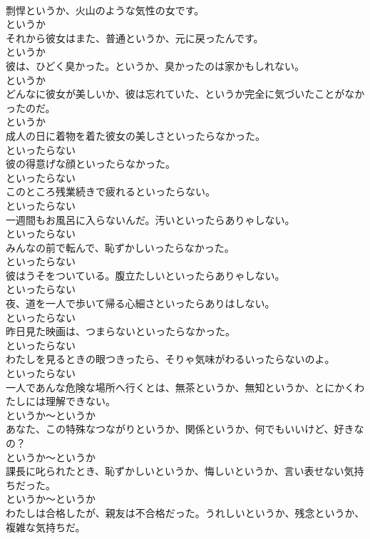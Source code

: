 \documentclass[8pt]{extreport}
\begin{document}
\begin{CJK}{UTF8}{min}
\\	剽悍というか、火山のような気性の女です。	
\\	というか
\\	それから彼女はまた、普通というか、元に戻ったんです。	
\\	というか
\\	彼は、ひどく臭かった。というか、臭かったのは家かもしれない。	
\\	というか
\\	どんなに彼女が美しいか、彼は忘れていた、というか完全に気づいたことがなかったのだ。	
\\	というか
\\	成人の日に着物を着た彼女の美しさといったらなかった。	
\\	といったらない
\\	彼の得意げな顔といったらなかった。	
\\	といったらない
\\	このところ残業続きで疲れるといったらない。	
\\	といったらない
\\	一週間もお風呂に入らないんだ。汚いといったらありゃしない。	
\\	といったらない
\\	みんなの前で転んで、恥ずかしいったらなかった。	
\\	といったらない
\\	彼はうそをついている。腹立たしいといったらありゃしない。	
\\	といったらない
\\	夜、道を一人で歩いて帰る心細さといったらありはしない。	
\\	といったらない
\\	昨日見た映画は、つまらないといったらなかった。	
\\	といったらない
\\	わたしを見るときの眼つきったら、そりゃ気味がわるいったらないのよ。	
\\	といったらない
\\	一人であんな危険な場所へ行くとは、無茶というか、無知というか、とにかくわたしには理解できない。	
\\	というか～というか
\\	あなた、この特殊なつながりというか、関係というか、何でもいいけど、好きなの？	
\\	というか～というか
\\	課長に叱られたとき、恥ずかしいというか、悔しいというか、言い表せない気持ちだった。	
\\	というか～というか
\\	わたしは合格したが、親友は不合格だった。うれしいというか、残念というか、複雑な気持ちだ。	

\end{CJK}
\end{document}
